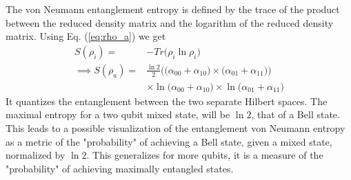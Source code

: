 The von Neumann entanglement entropy is defined by the trace of the product between the reduced density matrix and the logarithm of the reduced density matrix. Using Eq. (\ref{eq:rho_a}) we get 
\begin{align}
    S(\rho_i) =& - Tr\Big(\rho_i \ln \rho_i\Big) \\
    \implies S(\rho_a) =& \frac{\ln2}{2}\Big((\alpha_{00}+\alpha_{10}\big) \times \big(\alpha_{01}+\alpha_{11}\big)\Big)\\ &\times\ln\big(\alpha_{00}+\alpha_{10}\big) \times\ln \big(\alpha_{01}+\alpha_{11}\big) \nonumber
\end{align}
It quantizes the entanglement between the two separate Hilbert spaces. The maximal entropy for a two qubit mixed state, will be $\ln 2$, that of a Bell state. This leads to a possible visualization of the entanglement von Neumann entropy as a metric of the "probability" of achieving a Bell state, given a mixed state, normalized by $\ln 2$. This generalizes for more qubits, it is a measure of the "probability" of achieving maximally entangled states. 
